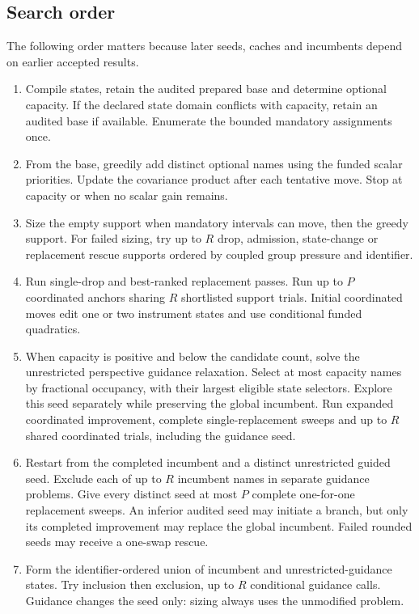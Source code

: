 \documentclass[11pt]{article}
\begin{document}
\subsection{Search order}
The following order matters because later seeds, caches and incumbents depend
on earlier accepted results.
\begin{enumerate}[leftmargin=*,itemsep=0.45em]
\item Compile states, retain the audited prepared base and determine optional
capacity. If the declared state domain conflicts with capacity, retain an
audited base if available. Enumerate the bounded mandatory assignments once.
\item From the base, greedily add distinct optional names using the funded
scalar priorities. Update the covariance product after each tentative move.
Stop at capacity or when no scalar gain remains.
\item Size the empty support when mandatory intervals can move, then the greedy
support. For failed sizing, try up to $R$ drop, admission, state-change or
replacement rescue supports ordered by coupled group pressure and identifier.
\item Run single-drop and best-ranked replacement passes. Run up to $P$
coordinated anchors sharing $R$ shortlisted support trials. Initial coordinated
moves edit one or two instrument states and use conditional funded quadratics.
\item When capacity is positive and below the candidate count, solve the
unrestricted perspective guidance relaxation. Select at most capacity names
by fractional occupancy, with their largest eligible state selectors. Explore
this seed separately while preserving the global incumbent. Run expanded
coordinated improvement, complete single-replacement sweeps and up to $R$
shared coordinated trials, including the guidance seed.
\item Restart from the completed incumbent and a distinct unrestricted guided
seed. Exclude each of up to $R$ incumbent names in separate guidance problems.
Give every distinct seed at most $P$ complete one-for-one replacement sweeps.
An inferior audited seed may initiate a branch, but only its completed
improvement may replace the global incumbent. Failed rounded seeds may receive
a one-swap rescue.
\item Form the identifier-ordered union of incumbent and unrestricted-guidance
states. Try inclusion then exclusion, up to $R$ conditional guidance calls.
Guidance changes the seed only: sizing always uses the unmodified problem.

\end{enumerate}
\end{document}
